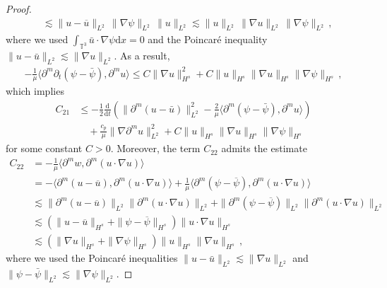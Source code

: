\documentclass[10pt,a4paper]{amsart}
\def\d{\mathrm{d}}
\def\p{\partial}
\begin{document}
\begin{proof}
\begin{equation*}
\begin{aligned}
& \lesssim \| u - \overline{u} \|_{L^2} \, \| \nabla \psi \|_{L^2} \, \| u \|_{L^2} \lesssim \| u \|_{L^2} \, \| \nabla u \|_{L^2} \, \| \nabla \psi \|_{L^2} \,,
\end{aligned}
\end{equation*}
where we used $ \int_{\mathbb{T}^3} \bar{u} \cdot \nabla \psi \d x=0$ and the Poincar\'e inequality $ \| u - \bar{u} \|_{L^2} \lesssim \| \nabla u \|_{L^2}$. As a result,
\begin{equation*}
\begin{aligned}
-\frac{1}{\mu}\langle \p^m\p_t(\psi-\bar{\psi}),\p^m u\rangle\leq C\|\nabla u\|^2_{H^s}+C\|u\|_{H^s}\|\nabla u\|_{H^s}\|\nabla \psi\|_{H^s} \,,
\end{aligned}
\end{equation*}
which implies
\begin{equation}\label{gpsi-eq9}
\begin{aligned}
C_{21} & \leq - \frac{1}{2} \frac{\d}{\d t} \left( \| \partial^m (u-\bar{u})\|_{L^2}^2 - \frac{2}{\mu} \langle \partial^m(\psi - \bar{\psi}), \partial^m u \rangle \right) \\
& \quad + \frac{c_p}{\mu}\|\nabla \partial^m u\|^2_{L^2} + C \| u \|_{H^s} \| \nabla u \|_{H^s} \| \nabla \psi \|_{H^s} 
\end{aligned}
\end{equation}
for some constant $C > 0 $. Moreover, the term $C_{22}$ admits the estimate
\begin{equation}\label{gpsi-eq10}
\begin{aligned}
C_{22}&= -\frac{1}{\mu} \langle \partial^m w, \partial^m (u\cdot \nabla u) \rangle \\&= -\langle \partial^m (u-\overline{u}), \partial^m (u\cdot \nabla u) \rangle + \frac{1}{\mu} \langle \partial^m (\psi - \overline{\psi}), \partial^m (u\cdot \nabla u) \rangle\\&
\lesssim \|\partial^m (u-\overline{u})\|_{L^2} \|\partial^m (u\cdot \nabla u)\|_{L^2} + \|\partial^m (\psi - \overline{\psi})\|_{L^2} \|\partial^m (u\cdot \nabla u)\|_{L^2}\\&
\lesssim (\|u-\overline{u}\|_{H^s} + \|\psi - \overline{\psi}\|_{H^s}) \|u\cdot \nabla u\|_{H^s}\\&
\lesssim (\|\nabla u\|_{H^s} + \|\nabla \psi\|_{H^s}) \|u\|_{H^s} \|\nabla u\|_{H^s} \,,
\end{aligned}
\end{equation}
where we used the Poincar\'e inequalities $\|u-\bar{u}\|_{L^2}\lesssim\|\nabla u\|_{L^2}$ and $\|\psi-\bar{\psi}\|_{L^2}\lesssim\|\nabla \psi\|_{L^2}$.


\end{proof}
\end{document}
